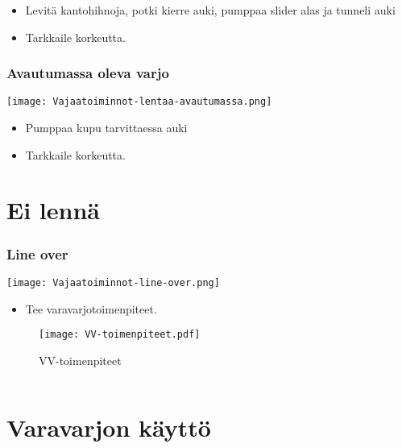 \begin{itemize}
\item  Levitä kantohihnoja, potki kierre auki, pumppaa slider alas ja tunneli auki 
\item  Tarkkaile korkeutta. 
\end{itemize}
\subsubsection{Avautumassa oleva varjo}
\label{paavarjon-vajaatoiminnot-avautumassa-oleva-varjo}


\begin{Figure}\centering\texttt{[image: Vajaatoiminnot-lentaa-avautumassa.png]}\end{Figure} 

\begin{itemize}
\item  Pumppaa kupu tarvittaessa auki 
\item  Tarkkaile korkeutta. 
\end{itemize}
\section{ Ei lennä }
\label{paavarjon-vajaatoiminnot-ei-lenna}

\subsubsection{Line over}
\label{paavarjon-vajaatoiminnot-line-over}


\begin{Figure}\centering\texttt{[image: Vajaatoiminnot-line-over.png]}\end{Figure} 

\begin{itemize}
\item  Tee varavarjotoimenpiteet. 
\end{itemize}

\begin{figure*}[]\centering\texttt{[image: VV-toimenpiteet.pdf]}\caption{VV-toimenpiteet}\end{figure*} 

\begin{verbatim} 
\end{verbatim}
\section{ Varavarjon käyttö }
\label{paavarjon-vajaatoiminnot-varavarjon-kaytto}


